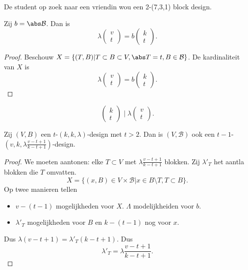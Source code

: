 \begin{vb}
	De student op zoek naar een vriendin wou een 2-(7,3,1) block design.
\end{vb}

\begin{lemma}
Zij $b = \abs\mathcal{B} $. Dan is \[
 \lambda \begin{pmatrix} v \\ t \end{pmatrix}  = b \begin{pmatrix} k \\t \end{pmatrix} 
.\] 
\end{lemma}
\begin{proof}
	Beschouw $X = \{(T, B) | T \subset B \subset V, \abs T = t, B \in \mathcal{B} \} $. 
	De kardinaliteit van $X$ is \[
	\lambda \begin{pmatrix} v \\t \end{pmatrix}  = b \begin{pmatrix} k \\t \end{pmatrix} 
	.\] 
\end{proof}
\begin{gevolg}
	\[
	\begin{pmatrix} k \\ t \end{pmatrix} \mathbin| \lambda \begin{pmatrix} v \\t \end{pmatrix} 
	.\] 
\end{gevolg}
\begin{stelling}
	Zij $(V, B)$ een $t$-$(k, k, \lambda)$-design met $t >2$. Dan is $(V, \mathcal{B} )$ ook een $t-1$-$(v, k , \lambda \frac{v -t + 1}{k - t + 1})$-design.
\end{stelling}
\begin{proof}
	We moeten aantonen: elke $T \subset  V$ met $\lambda \frac{v - t + 1}{k - t + 1}$ blokken.
	Zij $\lambda'_T$ het aantla blokken die $T$ omvatten. 
	\[
		X = \{ (x, B) \in V \times \mathcal{B}  | x \in B \setminus T, T \subset B\} 
	.\] 
	Op twee manieren tellen
	\begin{itemize}
		\item $v - (t -1)$ mogelijkheden voor $X$. $\Lambda$ modelijkheiden voor  $b$. 
		\item $\lambda'_T$ mogelijkheden voor $B$  en $k-(t-1)$ nog voor $x$. 
	\end{itemize}
	Dus $\lambda(v - t + 1) = \lambda'_T(k -t + 1)$.
	Dus \[
	\lambda'_T = \lambda \frac{v-t +1}{k - t + 1}
	.\] 
\end{proof}
